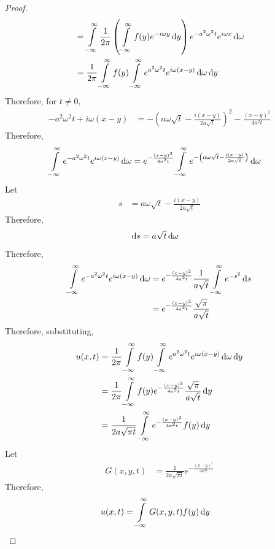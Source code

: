 \documentclass[titlepage, fleqn, a4paper, 12pt, twoside]{article}
\theoremstyle{definition}
\theoremstyle{theorem}
\begin{document}
\begin{proof}
\begin{align*}
                       & = \int\limits_{-\infty}^{\infty} \frac{1}{2 \pi} \left( \int\limits_{-\infty}^{\infty} f(y) e^{-i \omega y} \dif y \right) e^{-a^2 \omega^2 t} e^{i \omega x} \dif \omega \\
                       & = \frac{1}{2 \pi} \int\limits_{-\infty}^{\infty} f(y) \int\limits_{-\infty}^{\infty} e^{a^2 \omega^2 t} e^{i \omega (x - y)} \dif \omega \dif y
	\end{align*}
	Therefore, for $t \neq 0$,
	\begin{align*}
		-a^2 \omega^2 t + i \omega (x - y) & = -\left( a \omega \sqrt{t} - \frac{i (x - y)}{2 a \sqrt{t}} \right)^2 - \frac{(x - y)^2}{4 a^2 t}
	\end{align*}
	Therefore,
	\begin{align*}
		\int\limits_{-\infty}^{\infty} e^{-a^2 \omega^2 t} e^{i \omega (x - y)} \dif \omega & = e^{-\frac{(x - y)^2}{4 a^2 t}} \int\limits_{-\infty}^{\infty} e^{-\left( a \omega \sqrt{t} - \frac{i (x - y)}{2 a \sqrt{t}} \right)} \dif \omega
	\end{align*}
	Let
	\begin{align*}
		s & = a \omega \sqrt{t} - \frac{i (x - y)}{2 a \sqrt{t}}
	\end{align*}
	Therefore,
	\begin{align*}
		\dif s & = a \sqrt{t} \dif \omega
	\end{align*}
	Therefore,
	\begin{align*}
		\int\limits_{-\infty}^{\infty} e^{-a^2 \omega^2 t} e^{i \omega (x - y)} \dif \omega & = e^{-\frac{(x - y)^2}{4 a^2 t}} \frac{1}{a \sqrt{t}} \int\limits_{-\infty}^{\infty} e^{-s^2} \dif s \\
                                                                                                    & = e^{-\frac{(x - y)^2}{4 a^2 t}} \frac{\sqrt{\pi}}{a \sqrt{t}}
	\end{align*}
	Therefore, substituting,
	\begin{align*}
		u(x,t) & = \frac{1}{2 \pi} \int\limits_{-\infty}^{\infty} f(y) \int\limits_{-\infty}^{\infty} e^{a^2 \omega^2 t} e^{i \omega (x - y)} \dif \omega \dif y \\
                       & = \frac{1}{2 \pi} \int\limits_{-\infty}^{\infty} f(y) e^{-\frac{(x - y)^2}{4 a^2 t}} \frac{\sqrt{\pi}}{a \sqrt{t}} \dif y                       \\
                       & = \frac{1}{2 a \sqrt{\pi t}} \int\limits_{-\infty}^{\infty} e^{-\frac{(x - y)^2}{4 a^2 t}} f(y) \dif y
	\end{align*}
	Let
	\begin{align*}
		G(x,y,t) & = \frac{1}{2 a \sqrt{\pi t}} e^{-\frac{(x - y)^2}{4 a^2 t}}
	\end{align*}
	Therefore,
	\begin{align*}
		u(x,t) & = \int\limits_{-\infty}^{\infty} G(x,y,t) f(y) \dif y
	\end{align*}
\end{proof}
\end{document}

